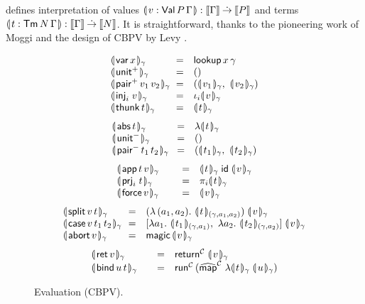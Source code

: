 \documentclass[sigconf,screen,fleqn]{acmart} %
\begin{document}
 defines
interpretation of values
$\llparenthesis\kern0.3ex v : \mathsf{Val}\,P\,\Gamma \kern0.3ex\rrparenthesis : \mathopen{{[\kern-0.14em[}} \Gamma \mathclose{{]\kern-0.14em]}} \mathbin{\dot{\to}} \mathopen{{[\kern-0.14em[}} P \mathclose{{]\kern-0.14em]}}$
and terms
$\llparenthesis\kern0.3ex t : \mathsf{Tm}^{\,}N\,\Gamma \kern0.3ex\rrparenthesis : \mathopen{{[\kern-0.14em[}} \Gamma \mathclose{{]\kern-0.14em]}} \mathbin{\dot{\to}} \mathopen{{[\kern-0.14em[}} N \mathclose{{]\kern-0.14em]}}$.
It is straightforward, thanks to the pioneering work of
Moggi \cite{moggi:infcomp91} and the
design of CBPV by Levy \cite{levy:hosc06}.
\begin{figure}[htbp]
\hrulefill
\[
\begin{array}{p{13ex}cl}
  \dent{\tvar\,x}\gamma & = & \tlookup\,x\,\gamma \\
  \dent{\punit}\gamma   & = & \ttempty \\
  \dent{\ppair\,v_1\,v_2}\gamma & = &
    (\dent{v_1}\gamma,\ \dent{v_2}\gamma) \\
  \dent{\inj i v}\gamma & = & \iota_i \dent v \gamma \\
  \dent{\tthunk\,t}\gamma & = & \dent t \gamma \\
\end{array}
\]
\dotfill
\[
\begin{array}{p{13ex}cl}
  \dent{\tabs\,t}\gamma
      & = & \fdent t \gamma \\
  \dent{\nunit}\gamma & = & \ttempty \\
  \dent{\npair\,t_1\,t_2}\gamma & = &
    (\dent{t_1}\gamma,\ \dent{t_2}\gamma) \\
\end{array}
\]
\dotfill
\[
\begin{array}{p{13ex}cl}
  \dent{\tapp\,t\,v} \gamma & = &
     \dent t \gamma\;\tid\;\dent v \gamma \\
  \dent{\prj i t}\gamma & = & \pi_i \dent t \gamma \\
  \dent{\tforce\,v}\gamma & = & \dent v \gamma \\
\end{array}
\]
\dotfill
\[
\begin{array}{p{13ex}cl}
  \dent{\tsplit\,v\,t}\gamma & = & (\lambda\,(a_1,a_2).\
    \dent{t}{(\gamma,a_1,a_2)} ) \; \dent v \gamma \\
  \dent{\tcase\,v\,t_1\,t_2}\gamma & = &
    [  \lambda a_1.\ \dent{t_1}{(\gamma,a_1)}
    ,\ \lambda a_2.\ \dent{t_2}{(\gamma,a_2)}
    ]\; \dent v \gamma \\
  \dent{\tabort\,v}\gamma & = & \tmagic\,\dent v \gamma \\
\end{array}
\]
\dotfill
\[
\begin{array}{p{13ex}cl}
  \dent{\tret\,v}\gamma & = & \treturn[\C] \; \dent v \gamma \\
  \dent{\tbind\,u\,t}\gamma & = & \trun^\C\,
    (\stmap[\C] \; \fdent t \gamma\; \dent u \gamma) \\
\end{array}
\]
\hrulefill
  \caption{Evaluation (CBPV).}
  \label{fig:evalcbpv}
\end{figure}
\end{document}
